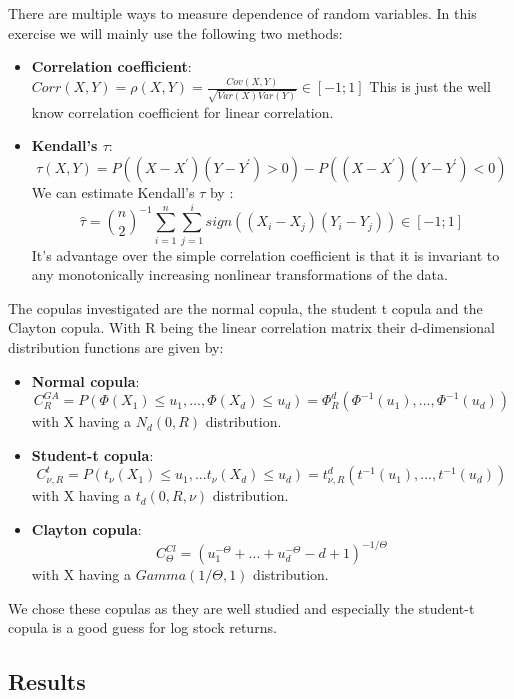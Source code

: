 \documentclass[11pt]{article}
\begin{document}
There are multiple ways to measure dependence of random variables. In this exercise we will mainly use the following two methods:
\begin{itemize}
    \item \textbf{Correlation coefficient}: $Corr(X,Y) = \rho(X,Y) = \frac{Cov(X,Y)}{\sqrt{Var(X)Var(Y)}} \in [-1;1]$
    This is just the well know correlation coefficient for linear correlation.
    \item \textbf{Kendall's $\tau$}: $$\tau(X,Y) = P((X-X^{'})(Y-Y^{'})>0) - P((X-X^{'})(Y-Y^{'})<0)$$
    We can estimate Kendall's $\tau$ by : $$\hat{\tau} = \binom{n}{2}^{-1}\sum_{i=1}^{n}\sum_{j=1}^{i}sign((X_{i}-X_{j})(Y_{i}-Y_{j})) \in [-1;1]$$
    It's advantage over the simple correlation coefficient is that it is invariant to any monotonically increasing nonlinear transformations of the data.
\end{itemize}

The copulas investigated are the normal copula, the student t copula and the Clayton copula. With R being the linear correlation matrix their d-dimensional distribution functions are given by:
\begin{itemize}
    \item \textbf{Normal copula}: 
    $$C_{R}^{GA} = P(\Phi(X_1) \leq u_1, ..., \Phi(X_d) \leq u_d) = \Phi_{R}^{d}(\Phi^{-1}(u_1), ..., \Phi^{-1}(u_d) )
    $$ with X having a $N_d(0,R)$ distribution.
    \item \textbf{Student-t copula}: 
    $$
    C^{t}_{\nu,R} = P(t_\nu(X_1) \leq u_1, ... t_\nu(X_d) \leq u_d ) = t^{d}_{\nu,R}(t^{-1}(u_1), ..., t^{-1}(u_d))
    $$ with X having a $t_d(0,R,\nu)$ distribution.
    \item \textbf{Clayton copula}:
    $$
    C_{\Theta}^{Cl} = (u_1^{-\Theta} + ... + u_d^{-\Theta} - d +1)^{-1/\Theta}
    $$ with X having a $Gamma(1/\Theta,1)$ distribution.
\end{itemize}

We chose these copulas as they are well studied and especially the student-t copula is a good guess for log stock returns.

\subsection*{Results}
\end{document}
